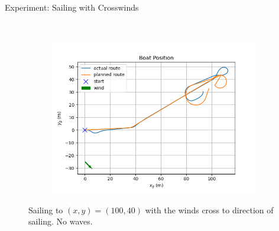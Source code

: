 \documentclass[10pt,xcolor={table,dvipsnames},t]{beamer}
\begin{document}
\begin{frame}{Experiment: Sailing with Crosswinds}
\begin{figure}
\begin{subfigure}[b]{0.35\textwidth}
         \label{fig:right_wind_speed}
     \end{subfigure}
     \hfill\\
     \begin{subfigure}[b]{0.4\textwidth}
         \centering
         \includegraphics[width=\textwidth,trim={0.5cm 0.25cm 1.25cm 0.75cm },clip]{documents/final_pres_figs/right_to_wind_to_40_40_pos.png}
         \label{fig:right_wind_pos}
     \end{subfigure}
    \caption{Sailing to \((x,y)=(100,40)\) with the winds cross to direction of sailing. No waves.}
    \label{fig:sail_crosswind}
\end{figure}
\end{frame}
\end{document}
